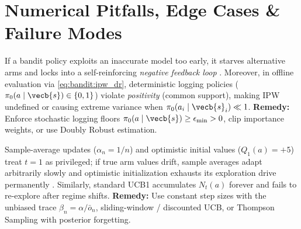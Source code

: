 \documentclass[../../../../master.tex]{subfiles}
\begin{document}


\section{Numerical Pitfalls, Edge Cases \& Failure Modes}
\label{sec:bandit:pitfalls}

\begin{pitfall}
If a bandit policy exploits an inaccurate model too early, it starves alternative arms and locks into a self-reinforcing \emph{negative feedback loop} . Moreover, in offline evaluation via \eqref{eq:bandit:ipw_dr}, deterministic logging policies ($\pi_0(a \mid \vecb{s}) \in \{0,1\}$) violate \emph{positivity} (common support), making IPW undefined or causing extreme variance when $\pi_0(a_i \mid \vecb{s}_i) \ll 1$. \textbf{Remedy:} Enforce stochastic logging floors $\pi_0(a \mid \vecb{s}) \ge \epsilon_{\min} > 0$, clip importance weights, or use Doubly Robust estimation.
\end{pitfall}

\begin{pitfall}
Sample-average updates ($\alpha_n = 1/n$) and optimistic initial values ($Q_1(a)=+5$) treat $t=1$ as privileged; if true arm values drift, sample averages adapt arbitrarily slowly and optimistic initialization exhausts its exploration drive permanently . Similarly, standard UCB1 accumulates $N_t(a)$ forever and fails to re-explore after regime shifts. \textbf{Remedy:} Use constant step sizes with the unbiased trace $\beta_n = \alpha/\bar{o}_n$, sliding-window / discounted UCB, or Thompson Sampling with posterior forgetting.
\end{pitfall}
\end{document}
